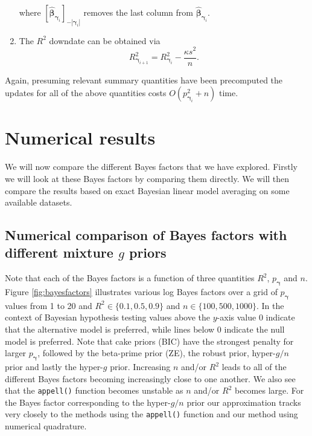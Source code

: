 \documentclass[12pt]{article}
\def\vectorfontone{\bf}
\def\vectorfonttwo{\boldsymbol}
\def\vy{{\vectorfontone y}}                      %
\def\vbeta{{\vectorfonttwo \beta}}               %
\def\vgamma{{\vectorfonttwo \gamma}}             %
\def\matrixfontone{\bf}
\def\mC{{\matrixfontone C}}                      %
\def\mX{{\matrixfontone X}}                      %
\begin{document}
\begin{enumerate}
	\noindent where $[ \widehat{\vbeta}_{\vgamma_{i}}]_{-|{\vgamma_{i}}|}$
	removes the last column from $\widehat{\vbeta}_{\vgamma_{i}}$.
	
	\item 
	The $R^2$ downdate can be obtained
	via
	$$
	R_{\vgamma_{i+1}}^2 = R_{\vgamma_{i}}^2 - \frac{\kappa s^2}{n}.
	$$
	
	
\end{enumerate}

\noindent Again, presuming relevant summary quantities have been precomputed
the updates for all of the above quantities costs $O(p_{\vgamma_{i}}^2 + n)$ time.



 
 
\section{Numerical results}
\label{sec:numerical}

We will now compare the different Bayes factors that we have explored. 
Firstly we will look at these Bayes factors by comparing them directly.
We will then compare the results based on exact Bayesian linear model
averaging on some available datasets.


\subsection{Numerical comparison of Bayes factors with different mixture $g$ priors}

Note that
each of the Bayes factors is a function of three quantities $R^2$, $p_\vgamma$ 
and $n$. Figure \ref{fig:bayesfactors} illustrates various log Bayes factors
over a grid of $p_\vgamma$ values from 1 to 20 and $R^2\in\{0.1,0.5,0.9\}$
and $n \in \{100,500,1000\}$. In the context of Bayesian hypothesis testing
values above the $y$-axis value 0 indicate that the alternative model is
preferred, while lines below 0 indicate the null model is preferred. Note that
cake priors (BIC) have the strongest penalty for larger $p_\vgamma$, followed
by the beta-prime prior (ZE), the robust prior, hyper-$g/n$ prior and lastly
the hyper-$g$ prior. Increasing $n$ and/or $R^2$ leads to all of the different
Bayes factors becoming increasingly close to one another. We also see that 
the {\tt appell()} function becomes unstable as $n$ and/or $R^2$ becomes large.
For the Bayes factor corresponding to the hyper-$g/n$ prior our approximation
tracks very closely to the methods using the {\tt appell()} function and our
method using numerical quadrature.
\end{document}
